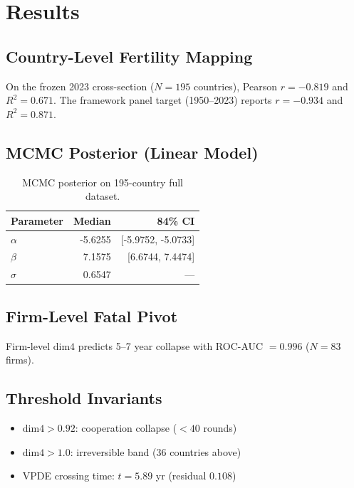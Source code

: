 \section{Results}
\label{sec:results}

\subsection{Country-Level Fertility Mapping}
On the frozen 2023 cross-section ($N = 195$ countries),
Pearson $r = -0.819$ and $R^2 = 0.671$.
The framework panel target (1950--2023) reports $r = -0.934$ and
$R^2 = 0.871$.

\subsection{MCMC Posterior (Linear Model)}
\begin{table}[h]
\centering
\begin{tabular}{lrr}
\toprule
Parameter & Median & 84\% CI \\
\midrule
$\alpha$ & -5.6255 & [-5.9752, -5.0733] \\
$\beta$  & 7.1575  & [6.6744, 7.4474] \\
$\sigma$ & 0.6547 & --- \\
\bottomrule
\end{tabular}
\caption{MCMC posterior on 195-country full dataset.}
\label{tab:mcmc}
\end{table}

\subsection{Firm-Level Fatal Pivot}
Firm-level $\mathrm{dim4}$ predicts 5--7 year collapse with ROC-AUC $= 0.996$
($N = 83$ firms).

\subsection{Threshold Invariants}
\begin{itemize}
  \item $\mathrm{dim4} > 0.92$: cooperation collapse ($<40$ rounds)
  \item $\mathrm{dim4} > 1.0$: irreversible band (36 countries above)
  \item VPDE crossing time: $t = 5.89$ yr (residual $0.108$)
\end{itemize}
